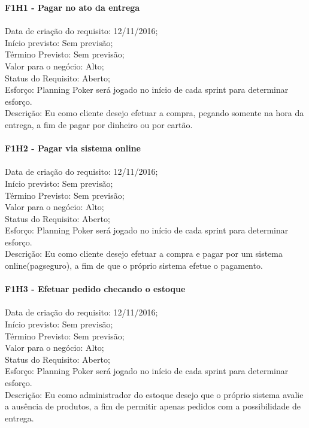\begin{apendicesenv}
\textbf{F1H1 - Pagar no ato da entrega }\\ \\
\tab Data de criação do requisito: 12/11/2016;\\
\tab Início previsto: Sem previsão;\\
\tab Término Previsto: Sem previsão;\\
\tab Valor para o negócio: Alto;\\
\tab Status do Requisito: Aberto;\\
\tab Esforço: Planning Poker será jogado no início de cada sprint para determinar esforço.\\
\tab Descrição: Eu como cliente desejo efetuar a compra, pegando somente na hora da entrega, a fim de pagar por dinheiro ou por cartão.\\
\\
\textbf{F1H2 - Pagar via sistema online}\\ \\
\tab Data de criação do requisito: 12/11/2016;\\
\tab Início previsto: Sem previsão;\\
\tab Término Previsto: Sem previsão;\\
\tab Valor para o negócio: Alto;\\
\tab Status do Requisito: Aberto;\\
\tab Esforço: Planning Poker será jogado no início de cada sprint para determinar esforço.\\
\tab Descrição: Eu como cliente desejo efetuar a compra e pagar por um sistema online(pagseguro), a fim de que o próprio sistema efetue o pagamento.\\
\\
\textbf{F1H3 - Efetuar pedido checando o estoque}\\ \\
\tab Data de criação do requisito: 12/11/2016;\\
\tab Início previsto: Sem previsão;\\
\tab Término Previsto: Sem previsão;\\
\tab Valor para o negócio: Alto;\\
\tab Status do Requisito: Aberto;\\
\tab Esforço: Planning Poker será jogado no início de cada sprint para determinar esforço.\\
\tab Descrição: Eu como administrador do estoque desejo que o próprio sistema avalie a ausência de produtos, a fim de permitir apenas pedidos com a possibilidade de entrega.\\

\end{apendicesenv}
